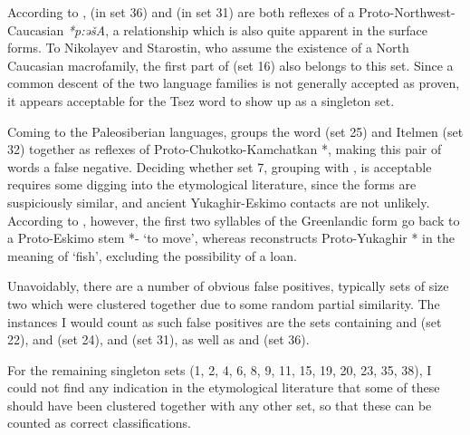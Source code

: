 According to \cite{nikolayev_starostin_1994},  \ipa{[p\t{ts}a\:z@j]} (in set 36) and  \ipa{[Ap\super hs1\t{dz}]} (in set 31) are both reflexes of a Proto-Northwest-Caucasian \textit{*p:ə\v{s}A}, a relationship which is also quite apparent in the surface forms. To Nikolayev and Starostin, who assume the existence of a North Caucasian macrofamily, the first part of  \ipa{[besuro]} (set 16) also belongs to this set. Since a common descent of the two language families is not generally accepted as proven, it appears acceptable for the Tsez word to show up as a singleton set.

Coming to the Paleosiberian languages, \cite{fortescue2005} groups the  word \ipa{[@nneen]} (set 25) and Itelmen \ipa{[@\textltailn \t{tS}]} (set 32)  together as reflexes of Proto-Chukotko-Kamchatkan *, making this pair of words a false negative. Deciding whether set 7, grouping   with  \ipa{[aalisaGaq]}, is acceptable requires some digging into the etymological literature, since the forms are suspiciously similar, and ancient Yukaghir-Eskimo contacts are not unlikely. According to \cite{fortescue_ea_2010}, however, the first two syllables of the Greenlandic form go back to a Proto-Eskimo stem *- `to move', whereas \citet[Lemma 1627]{nikolaeva2006} reconstructs Proto-Yukaghir * in the meaning of `fish', excluding the possibility of a loan.

Unavoidably, there are a number of obvious false positives, typically sets of size two which were clustered together due to some random partial similarity. The instances I would count as such false positives are the sets containing  and  (set 22),  and  (set 24),  and  (set 31), as well as  and  (set 36).

For the remaining singleton sets (1, 2, 4, 6, 8, 9, 11, 15, 19, 20, 23, 35, 38), I could not find any indication in the etymological literature that some of these should have been clustered together with any other set, so that these can be counted as correct classifications.

